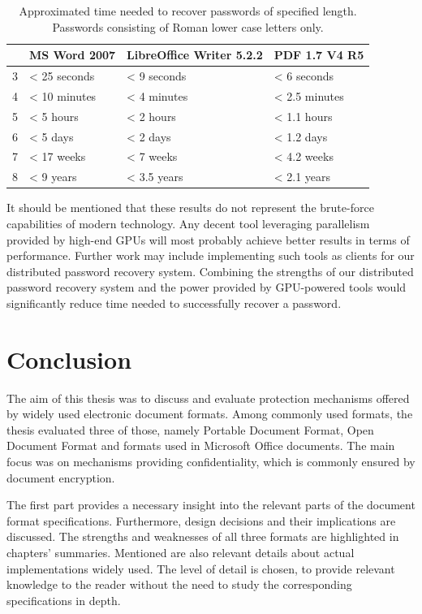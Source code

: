 \documentclass[11pt,oneside]{fithesis2}
\begin{document}
 \begin{table}[h]
	\centering
	\begin{tabular}{|l|l|l|l|}
           \hline
		&\textbf{MS Word 2007}&\textbf{LibreOffice Writer 5.2.2}&\textbf{PDF 1.7 V4 R5}\\
	\hline
		3&< 25 seconds&< 9 seconds&< 6 seconds\\
	\hline
		4&< 10 minutes&< 4 minutes&< 2.5 minutes\\
	\hline
		5&< 5 hours& < 2 hours&< 1.1 hours\\
	\hline
		6&< 5 days&< 2 days&< 1.2 days\\
	\hline
		7&< 17 weeks&< 7 weeks&< 4.2 weeks\\
	\hline
		8&< 9 years&< 3.5 years&< 2.1 years\\
	\hline
           \end{tabular}
	\caption{Approximated time needed to recover passwords of specified length. Passwords consisting of Roman lower case letters only.}
	\label{real_world_time}
\end{table}

It should be mentioned that these results do not represent the brute-force capabilities of modern technology. Any decent tool leveraging parallelism provided by high-end GPUs will most probably achieve better results in terms of performance. Further work may include implementing such tools as clients for our distributed password recovery system. Combining the strengths of our distributed password recovery system and the power provided by GPU-powered tools would significantly reduce time needed to successfully recover a password.

\chapter{Conclusion}

The aim of this thesis was to discuss and evaluate protection mechanisms offered by widely used electronic document formats. Among commonly used formats, the thesis evaluated three of those, namely Portable Document Format, Open Document Format and formats used in Microsoft Office documents. The main focus was on mechanisms providing confidentiality, which is commonly ensured by document encryption. 

The first part provides a necessary insight into the relevant parts of the document format specifications. Furthermore, design decisions and their implications are discussed. The strengths and weaknesses of all three formats are highlighted in chapters' summaries. Mentioned are also relevant details about actual implementations widely used. The level of detail is chosen, to provide relevant knowledge to the reader without the need to study the corresponding specifications in depth.
\end{document}
